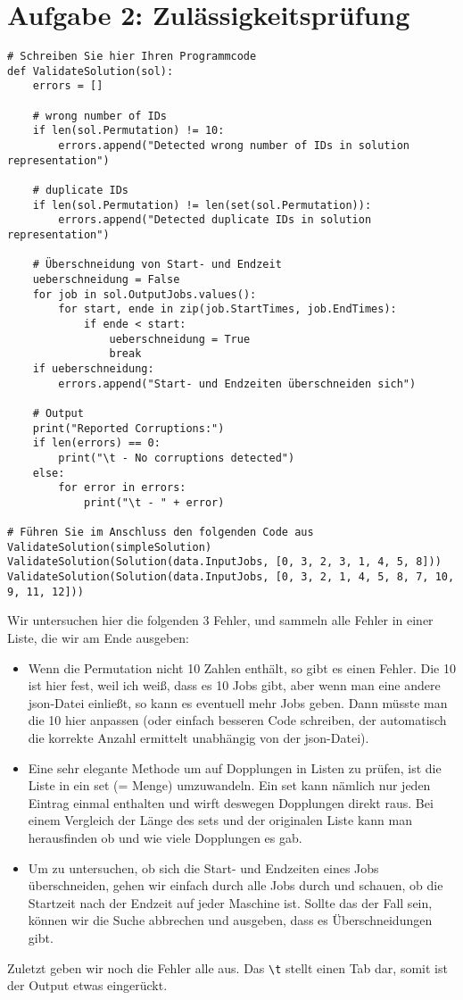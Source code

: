 \documentclass{article}
\begin{document}
	\section*{Aufgabe 2: Zulässigkeitsprüfung}
	\begin{lstlisting}
# Schreiben Sie hier Ihren Programmcode
def ValidateSolution(sol):
	errors = []

	# wrong number of IDs
	if len(sol.Permutation) != 10:
		errors.append("Detected wrong number of IDs in solution representation")

	# duplicate IDs
	if len(sol.Permutation) != len(set(sol.Permutation)):
		errors.append("Detected duplicate IDs in solution representation")

	# Überschneidung von Start- und Endzeit
	ueberschneidung = False
	for job in sol.OutputJobs.values():
		for start, ende in zip(job.StartTimes, job.EndTimes):
			if ende < start:
				ueberschneidung = True
				break
	if ueberschneidung:
		errors.append("Start- und Endzeiten überschneiden sich")

	# Output
	print("Reported Corruptions:")
	if len(errors) == 0:
		print("\t - No corruptions detected")
	else:
		for error in errors:
			print("\t - " + error)

# Führen Sie im Anschluss den folgenden Code aus
ValidateSolution(simpleSolution)
ValidateSolution(Solution(data.InputJobs, [0, 3, 2, 3, 1, 4, 5, 8]))
ValidateSolution(Solution(data.InputJobs, [0, 3, 2, 1, 4, 5, 8, 7, 10, 9, 11, 12]))
	\end{lstlisting}
	Wir untersuchen hier die folgenden 3 Fehler, und sammeln alle Fehler in einer Liste, die wir am Ende ausgeben:
	\begin{itemize}
		\item Wenn die Permutation nicht 10 Zahlen enthält, so gibt es einen Fehler. Die 10 ist hier fest, weil ich weiß, dass es 10 Jobs gibt, aber wenn man eine andere json-Datei einließt, so kann es eventuell mehr Jobs geben. Dann müsste man die 10 hier anpassen (oder einfach besseren Code schreiben, der automatisch die korrekte Anzahl ermittelt unabhängig von der json-Datei).
		\item Eine sehr elegante Methode um auf Dopplungen in Listen zu prüfen, ist die Liste in ein set (= Menge) umzuwandeln. Ein set kann nämlich nur jeden Eintrag einmal enthalten und wirft deswegen Dopplungen direkt raus. Bei einem Vergleich der Länge des sets und der originalen Liste kann man herausfinden ob und wie viele Dopplungen es gab.
		\item Um zu untersuchen, ob sich die Start- und Endzeiten eines Jobs überschneiden, gehen wir einfach durch alle Jobs durch und schauen, ob die Startzeit nach der Endzeit auf jeder Maschine ist. Sollte das der Fall sein, können wir die Suche abbrechen und ausgeben, dass es Überschneidungen gibt.
	\end{itemize}
	Zuletzt geben wir noch die Fehler alle aus. Das \texttt{\textbackslash t} stellt einen Tab dar, somit ist der Output etwas eingerückt.
\end{document}
